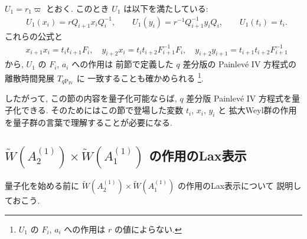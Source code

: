 \documentclass[12pt,twoside,dvipdfm]{msjproc}
\theoremstyle{definition} %
\theoremstyle{definition} %
\theoremstyle{definition} %
\numberwithin{theorem}{section}
\numberwithin{equation}{section}
\numberwithin{figure}{section}
\numberwithin{table}{section}
\newcommand\qP[1]{{\text{$q\mathrm{P}_{\text{#1}}$}}}
\newcommand\WW{\widetilde{W}}
\begin{document}
$U_1=r_1 \varpi$ とおく. 
このとき $U_1$ は以下を満たしている:
\begin{align*}
 &
 U_1(x_i) = r Q_{i+1} x_i Q_i^{-1},
 \qquad
 U_1(y_i) = r^{-1} Q_{i+1}^{-1}y_i Q_i,
 \qquad
 U_1(t_i) = t_i.%
\end{align*}
これらの公式と
\begin{align*}
 &
 x_{i+1}x_i = t_i t_{i+1} F_i, \quad
 y_{i+2}x_i = t_i t_{i+2} F_{i+1}^{-1} F_i,
\quad
 y_{i+2}y_{i+1} = t_{i+1} t_{i+2}F_{i+1}^{-1}
\end{align*}
から, $U_1$ の $F_i$, $a_i$ への作用は
前節で定義した $q$ 差分版の Painlev\'e IV 方程式の離散時間発展 $T_\qP{IV}$ に
一致することも確かめられる%
\footnote{$U_1$ の $F_i$, $a_i$ への作用は $r$ の値によらない.}.

したがって, この節の内容を量子化可能ならば, 
$q$ 差分版 Painlev\'e IV 方程式を量子化できる.
そのためにはこの節で登場した変数 $t_i$, $x_i$, $y_i$ と
拡大Weyl群の作用を量子群の言葉で理解することが必要になる.  

\subsection{$\WW(A^{(1)}_2)\times\WW(A^{(1)}_1)$ の作用のLax表示}

量子化を始める前に $\WW(A^{(1)}_2)\times\WW(A^{(1)}_1)$ の作用のLax表示について
説明しておこう.
\end{document}
